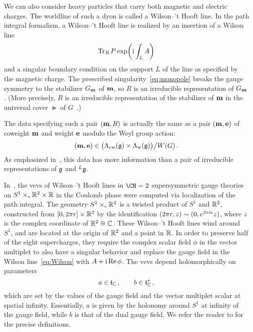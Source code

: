 We can also consider heavy particles that carry both magnetic and
electric charges.  The worldline of such a dyon is called a Wilson--'t
Hooft line.  In the path integral formalism, a Wilson--'t Hooft line
is realized by an insertion of a Wilson line
\begin{equation}
  \label{eq:Wilson}
  \mathop{\mathrm{Tr}}\nolimits_R P\exp\biggl(\mathrm{i}\int_L A\biggr)
\end{equation}
and a singular boundary condition on the support $L$ of the line as
specified by the magnetic charge.  The prescribed
singularity~\eqref{eq:monopole} breaks the gauge symmetry to the
stabilizer $G_{\mathbf{m}}$ of $\mathbf{m}$, so $R$ is an irreducible
representation of $G_{\mathbf{m}}$.  (More precisely, $R$ is an
irreducible representation of the stabilizer of $\mathbf{m}$ in the
universal cover $\Gt$ of $G$~\cite{Kapustin:2005py}.)

The data specifying such a pair $(\mathbf{m},R)$ is actually the same as
a pair $(\mathbf{m}, \mathbf{e})$ of coweight $\mathbf{m}$ and weight
$\mathbf{e}$ modulo the Weyl group action:
\begin{equation}
  (\mathbf{m}, \mathbf{e})
  \in
  \bigl(\Lambda_{\mathrm{cw}}(\mathfrak{g}) \times \Lambda_{\mathrm{w}}(\mathfrak{g})\bigr)\big/W(G) \,. 
\end{equation}
As emphasized in~\cite{Kapustin:2005py}, this data has more information than
a pair of irreducible representations of $\mathfrak{g}$ and ${}^L\mathfrak{g}$.

In~\cite{Ito:2011ea}, the vevs of Wilson--'t Hooft lines in $\CN=2$
supersymmetric gauge theories on $S^1 \times_\epsilon \mathbb{R}^2 \times \mathbb{R}$ in
the Coulomb phase were computed via localization of the path integral.
The geometry $S^1 \times_\epsilon \mathbb{R}^2$ is a twisted product of $S^1$ and
$\mathbb{R}^2$, constructed from $[0,2\pi r] \times \mathbb{R}^2$ by the
identification $(2\pi r,z) \sim (0, e^{2\pi\mathrm{i}\epsilon} z)$, where $z$ is
the complex coordinate of $\mathbb{R}^2 \cong \mathbb{C}$.  These Wilson--'t Hooft
lines wind around $S^1$, and are located at the origin of $\mathbb{R}^2$ and a
point in $\mathbb{R}$.  In order to preserve half of the eight supercharges,
they require the complex scalar field $\phi$ in the vector multiplet
to also have a singular behavior and replace the gauge field in the
Wilson line~\eqref{eq:Wilson} with $A + \mathrm{i}\mathop{\mathrm{Re}}\nolimits\phi$.  The vevs depend
holomorphically on parameters
\begin{equation}
  a \in \mathfrak{t}_{\mathbb{C}} \,,
  \qquad
  b \in \mathfrak{t}^*_{\mathbb{C}} \,,
\end{equation}
which are set by the values of the gauge field and the vector
multiplet scalar at spatial infinity.  Essentially, $a$ is given by
the holonomy around $S^1$ at infinity of the gauge field, while $b$ is
that of the dual gauge field.  We refer the reader to
\cite{Ito:2011ea} for the precise definitions.

